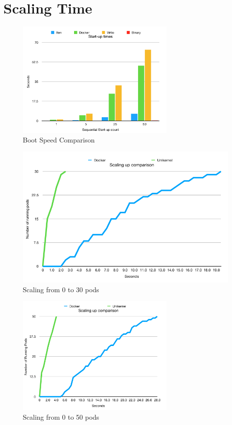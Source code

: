 \section{Scaling Time}


\begin{figure}[htpb]
    \centering
    \includegraphics[width=0.7\textwidth]{figures/boot-speed.png}
    \caption{Boot Speed Comparison } \label{fig:boot-time}
  \end{figure}
  


\begin{figure}[htpb]
    \centering
    \includegraphics[width=1\textwidth]{figures/scales/scale-up-30.png}
    \caption{Scaling from 0 to 30 pods } \label{fig:scale-up-30}
  \end{figure}
  

\begin{figure}[htpb]
    \centering
    \includegraphics[width=0.7\textwidth]{figures/scales/scale-up-50.png}
    \caption{Scaling from 0 to 50 pods } \label{fig:scale-up-50}
  \end{figure}
  
